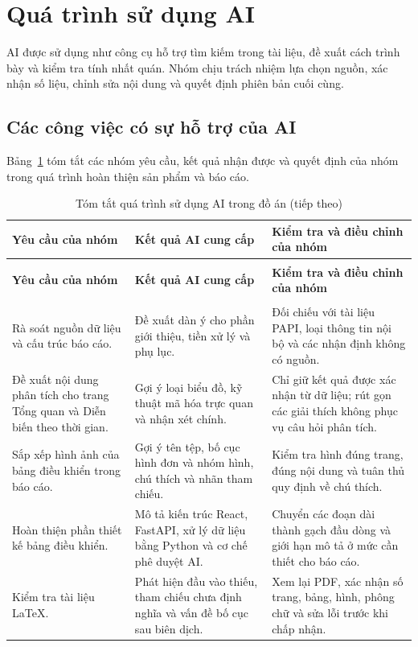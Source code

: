 \section{Quá trình sử dụng AI}
\label{appendix:ai-usage}

AI được sử dụng như công cụ hỗ trợ tìm kiếm trong tài liệu, đề xuất cách trình bày và kiểm tra tính nhất quán. Nhóm chịu trách nhiệm lựa chọn nguồn, xác nhận số liệu, chỉnh sửa nội dung và quyết định phiên bản cuối cùng.

\subsection{Các công việc có sự hỗ trợ của AI}

Bảng~\ref{tab:appendix-ai-tasks} tóm tắt các nhóm yêu cầu, kết quả nhận được và quyết định của nhóm trong quá trình hoàn thiện sản phẩm và báo cáo.

\small
\begin{longtable}{@{}>{\raggedright\arraybackslash}p{}>{\raggedright\arraybackslash}p{}>{\raggedright\arraybackslash}p{}@{}}
\caption{Tóm tắt quá trình sử dụng AI trong đồ án}
\label{tab:appendix-ai-tasks}\\
\toprule
\textbf{Yêu cầu của nhóm} & \textbf{Kết quả AI cung cấp} & \textbf{Kiểm tra và điều chỉnh của nhóm} \\
\midrule
\endfirsthead
\caption[]{Tóm tắt quá trình sử dụng AI trong đồ án (tiếp theo)}\\
\toprule
\textbf{Yêu cầu của nhóm} & \textbf{Kết quả AI cung cấp} & \textbf{Kiểm tra và điều chỉnh của nhóm} \\
\midrule
\endhead
\midrule
\multicolumn{3}{r}{\textit{Còn tiếp ở trang sau}}\\
\endfoot
\bottomrule
\endlastfoot
Rà soát nguồn dữ liệu và cấu trúc báo cáo. & Đề xuất dàn ý cho phần giới thiệu, tiền xử lý và phụ lục. & Đối chiếu với tài liệu PAPI, loại thông tin nội bộ và các nhận định không có nguồn. \\
Đề xuất nội dung phân tích cho trang Tổng quan và Diễn biến theo thời gian. & Gợi ý loại biểu đồ, kỹ thuật mã hóa trực quan và nhận xét chính. & Chỉ giữ kết quả được xác nhận từ dữ liệu; rút gọn các giải thích không phục vụ câu hỏi phân tích. \\
Sắp xếp hình ảnh của bảng điều khiển trong báo cáo. & Gợi ý tên tệp, bố cục hình đơn và nhóm hình, chú thích và nhãn tham chiếu. & Kiểm tra hình đúng trang, đúng nội dung và tuân thủ quy định về chú thích. \\
Hoàn thiện phần thiết kế bảng điều khiển. & Mô tả kiến trúc React, FastAPI, xử lý dữ liệu bằng Python và cơ chế phê duyệt AI. & Chuyển các đoạn dài thành gạch đầu dòng và giới hạn mô tả ở mức cần thiết cho báo cáo. \\
Kiểm tra tài liệu LaTeX. & Phát hiện đầu vào thiếu, tham chiếu chưa định nghĩa và vấn đề bố cục sau biên dịch. & Xem lại PDF, xác nhận số trang, bảng, hình, phông chữ và sửa lỗi trước khi chấp nhận. \\
\end{longtable}
\normalsize

